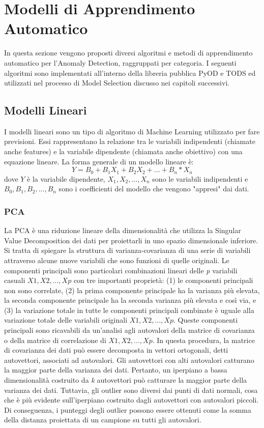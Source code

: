 \section{Modelli di Apprendimento Automatico}
In questa sezione vengono proposti diversi algoritmi e metodi di apprendimento automatico per l'Anomaly Detection, raggruppati per categoria.
I seguenti algoritmi sono implementati all'interno della libreria pubblica PyOD e TODS ed utilizzati nel processo di Model Selection discusso nei capitoli successivi.

\subsection{Modelli Lineari}
I modelli lineari sono un tipo di algoritmo di Machine Learning utilizzato per fare previsioni. Essi rappresentano la relazione tra le variabili indipendenti (chiamate anche features) e la variabile dipendente (chiamata anche obiettivo) con una equazione lineare. La forma generale di un modello lineare è: 
\[ Y = B_0 + B_1X_1 + B_2X_2 + ... + B_n*X_n\]
dove $ Y $ è la variabile dipendente,  \(X_1, X_2, ..., X_n\)  sono le variabili indipendenti e \( B_0, B_1, B_2, ..., B_n\) sono i coefficienti del modello che vengono "appresi" dai dati.

\subsubsection{PCA}
La PCA è una riduzione lineare della dimensionalità che utilizza la Singular Value Decomposition dei dati per proiettarli in uno spazio dimensionale inferiore. Si tratta di spiegare la struttura di varianza-covarianza di una serie di variabili attraverso alcune nuove variabili che sono funzioni di quelle originali. Le componenti principali sono particolari combinazioni lineari delle \textit{p} variabili casuali  \(X1, X2, ..., Xp\) con tre importanti proprietà: (1) le componenti principali non sono correlate, (2) la prima componente principale ha la varianza più elevata, la seconda componente principale ha la seconda varianza più elevata e così via, e (3) la variazione totale in tutte le componenti principali combinate è uguale alla variazione totale delle variabili originali \(X1, X2, ..., Xp\). 
Queste componenti principali sono ricavabili da un'analisi agli autovalori della matrice di covarianza o della matrice di correlazione di \(X1, X2, ..., Xp\).
In questa procedura, la matrice di covarianza dei dati può essere decomposta in vettori ortogonali, detti autovettori, associati ad autovalori. Gli autovettori con alti autovalori catturano la maggior parte della varianza dei dati. Pertanto, un iperpiano a bassa dimensionalità costruito da \textit{k} autovettori può catturare la maggior parte della varianza dei dati. Tuttavia, gli outlier sono diversi dai punti di dati normali, cosa che è più evidente sull'iperpiano costruito dagli autovettori con autovalori piccoli.
Di conseguenza, i punteggi degli outlier possono essere ottenuti come la somma della distanza proiettata di un campione su tutti gli autovalori.

